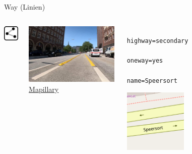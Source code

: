 \documentclass{beamer}
\begin{document}
			\begin{frame}[fragile]{Way (Linien)}
				\begin{center}
					\begin{columns}
						\begin{column}{1cm}
							\centering
							\includegraphics[width=1cm]{images/240px-Mf_way.png}
						\end{column}
						\begin{column}{4.5cm}
							\centering
							\includegraphics[width=4.5cm]{images/way-example.jpg}
							\textcolor{gray}{
								\tiny
								\href{https://www.mapillary.com/app/?pKey=680503257254203}{Mapillary}
							}
						\end{column}
						\begin{column}{3.5cm}
							\begin{verbatim}
								highway=secondary
								oneway=yes
								name=Speersort
							\end{verbatim}
							\begin{center}
								\includegraphics[height=3cm]{images/secondary.png}
							\end{center}
						\end{column}
					\end{columns}
				\end{center}
			\end{frame}
			
\end{document}
